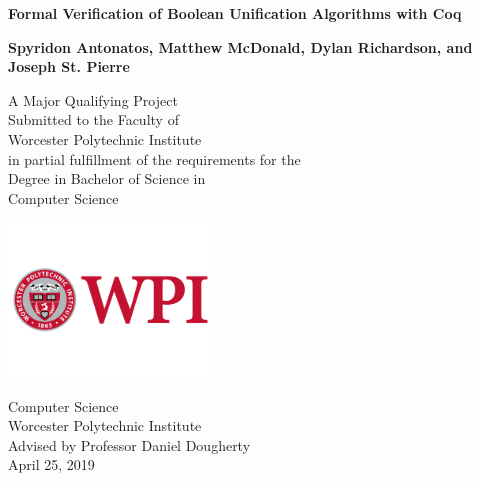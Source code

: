 
\begin{titlepage}
    \begin{center}
        \vspace*{1cm}
 
        \Huge
        \textbf{Formal Verification of Boolean Unification Algorithms with Coq}
 
        \vspace{1.5cm}
        
        \Large
        \textbf{Spyridon Antonatos, Matthew McDonald, Dylan Richardson, and Joseph St. Pierre}
 
        \vfill
 
        A Major Qualifying Project \\
        Submitted to the Faculty of \\
        Worcester Polytechnic Institute \\
        in partial fulfillment of the requirements for the \\
        Degree in Bachelor of Science in \\
        Computer Science
 
        \vspace{0.5cm}
 
        \includegraphics[width=0.4\textwidth]{logo}
 
        \Large
        Computer Science \\
        Worcester Polytechnic Institute \\
        Advised by Professor Daniel Dougherty \\
        April 25, 2019
 
    \end{center}
\end{titlepage}
